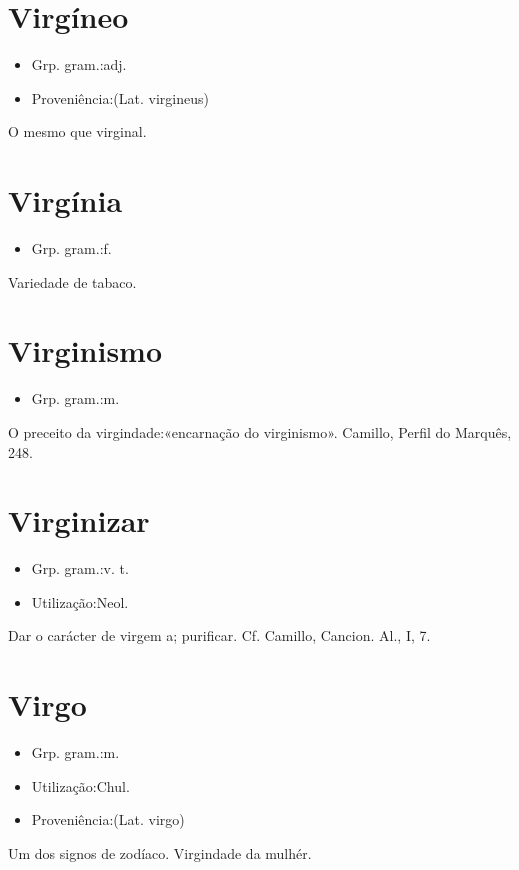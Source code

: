 \documentclass{article}
\begin{document}
\section{Virgíneo}
\begin{itemize}
\item {Grp. gram.:adj.}
\end{itemize}
\begin{itemize}
\item {Proveniência:(Lat. \textunderscore virgineus\textunderscore )}
\end{itemize}
O mesmo que \textunderscore virginal\textunderscore .
\section{Virgínia}
\begin{itemize}
\item {Grp. gram.:f.}
\end{itemize}
Variedade de tabaco.
\section{Virginismo}
\begin{itemize}
\item {Grp. gram.:m.}
\end{itemize}
O preceito da virgindade:«\textunderscore encarnação do virginismo\textunderscore ». Camillo, \textunderscore Perfil do Marquês\textunderscore , 248.
\section{Virginizar}
\begin{itemize}
\item {Grp. gram.:v. t.}
\end{itemize}
\begin{itemize}
\item {Utilização:Neol.}
\end{itemize}
Dar o carácter de virgem a; purificar. Cf. Camillo, \textunderscore Cancion. Al.\textunderscore , I, 7.
\section{Virgo}
\begin{itemize}
\item {Grp. gram.:m.}
\end{itemize}
\begin{itemize}
\item {Utilização:Chul.}
\end{itemize}
\begin{itemize}
\item {Proveniência:(Lat. \textunderscore virgo\textunderscore )}
\end{itemize}
Um dos signos de zodíaco.
Virgindade da mulhér.
\end{document}
